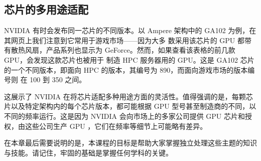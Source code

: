 \subsection{芯片的多用途适配}

NVIDIA 有时会发布同一芯片的不同版本。以 Ampere 架构中的 GA102 为例，在其网页上我们注意到它常用于游戏市场——因为大多
数采用该芯片的 GPU 都带有散热风扇，产品系列也显示为 GeForce。然而，如果查看该表格的前几款 GPU，会发现这款芯片也被用于
制造 HPC 服务器用的 GPU。这是 GA102 芯片的一个不同版本，即面向 HPC 的版本，其编号为 890，而面向游戏市场的版本编号则
在 100 到 350 之间。

这展示了 NVIDIA 在将芯片适配多种用途方面的灵活性。值得强调的是，每颗芯片以及特定架构内的每个芯片版本，都可能根据 GPU 
型号甚至制造商的不同，以不同的频率运行。这是因为 NVIDIA 会向市场上的多家公司提供 GPU 芯片和授权，由这些公司生产 GPU
，它们在频率等细节上可能略有差异。

在本章最后需要说明的是，本课程的目标是帮助大家掌握独立处理这些主题的知识与技能。请记住，牢固的基础是掌握任何学科的关键。
